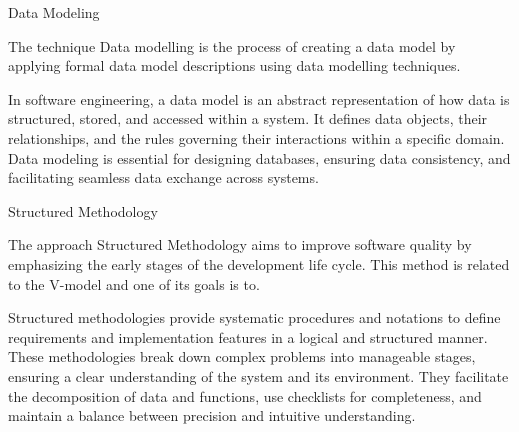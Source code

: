 \seccc Data Modeling 

The technique {\sbf Data modelling} is the process of creating a data model by applying formal data model descriptions using data modelling techniques.

In software engineering, a data model is an abstract representation of how data is structured, stored, and accessed within a system. It defines data objects, their relationships, and the rules governing their interactions within a specific domain. Data modeling is essential for designing databases, ensuring data consistency, and facilitating seamless data exchange across systems.

\seccc Structured Methodology  

The approach {\sbf Structured Methodology} aims to improve software quality by emphasizing the early stages of the development life cycle. This method is related to the V-model and one of its goals is to.

Structured methodologies provide systematic procedures and notations to define requirements and implementation features in a logical and structured manner. These methodologies break down complex problems into manageable stages, ensuring a clear understanding of the system and its environment. They facilitate the decomposition of data and functions, use checklists for completeness, and maintain a balance between precision and intuitive understanding.  

